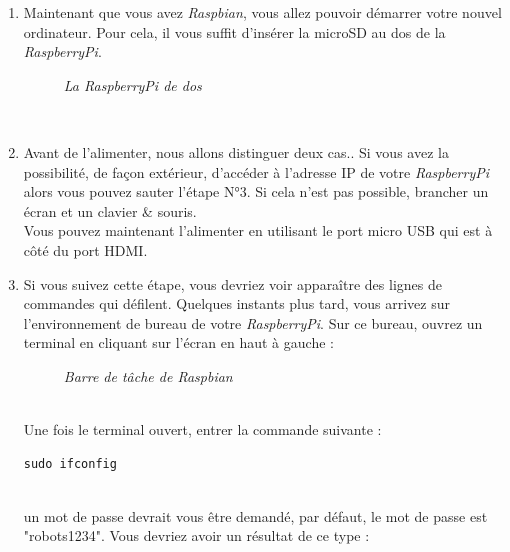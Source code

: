 \begin{enumerate}

	\item Maintenant que vous avez \textit{Raspbian}, vous allez pouvoir démarrer votre nouvel ordinateur.
Pour cela, il vous suffit d'insérer la microSD au dos de la \textit{RaspberryPi}.\\
\begin{figure}[H]
\begin{center}
\end{center}
	\caption{ \textit{La \textit{RaspberryPi} de dos}}
\end{figure}\\

	\item Avant de l'alimenter, nous allons distinguer deux cas.. Si vous avez la possibilité, de façon extérieur, d'accéder à l'adresse IP de votre \textit{RaspberryPi} alors vous pouvez sauter l'étape N°3. Si cela n'est pas possible, brancher un écran et un clavier & souris.\\
	Vous pouvez maintenant l'alimenter en utilisant le port micro USB qui est à côté du port HDMI.\\

\newpage
	
	\item Si vous suivez cette étape, vous devriez voir apparaître des lignes de commandes qui défilent. Quelques instants plus tard, vous arrivez sur l'environnement de bureau de votre \textit{RaspberryPi}. Sur ce bureau, ouvrez un terminal en cliquant sur l'écran en haut à gauche : 
	
\begin{figure}[H]
\begin{center}
\end{center}
	\caption{ \textit{Barre de tâche de Raspbian}}
\end{figure}\\

Une fois le terminal ouvert, entrer la commande suivante :
\begin{lstlisting}[style=MyBashStyle]
	sudo ifconfig
\end{lstlisting}\\

un mot de passe devrait vous être demandé, par défaut, le mot de passe est "robots1234".
Vous devriez avoir un résultat de ce type :\\


\end{enumerate}
